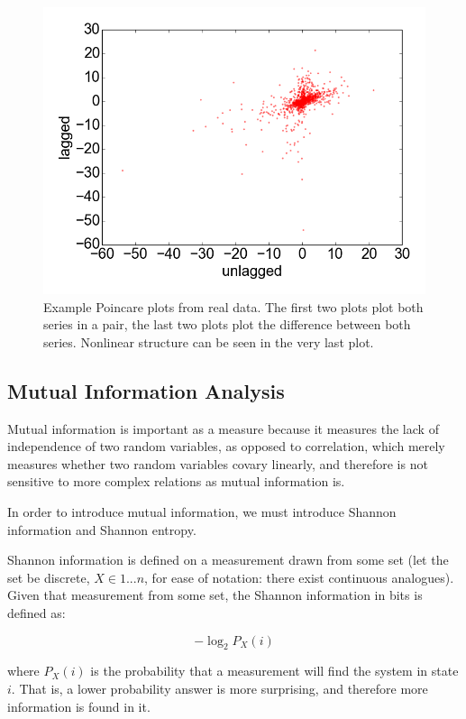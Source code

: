 \documentclass[12pt]{article}
\begin{document}
\begin{figure}
  \includegraphics[scale=0.4]{poincare_4}
  \caption{Example Poincare plots from real data. The first two plots plot both series in a pair, the last two plots plot the difference between both series. Nonlinear structure can be seen in the very last plot.}
  \label{fig:poincare_plots}
\end{figure}

\subsection{Mutual Information Analysis}

Mutual information is important as a measure because it measures the lack of independence of two random variables, as opposed to correlation, which merely measures whether two random variables covary linearly, and therefore is not sensitive to more complex relations as mutual information is.

In order to introduce mutual information, we must introduce Shannon information and Shannon entropy\cite{nnmi}.

Shannon information is defined on a measurement drawn from some set (let the set be discrete, $X \in {1 ... n}$, for ease of notation: there exist continuous analogues). Given that measurement from some set, the Shannon information in bits is defined as:

$$ -\log_2 P_X(i) $$

where $P_X(i)$ is the probability that a measurement will find the system in state $i$. That is, a lower probability answer is more surprising, and therefore more information is found in it.
\end{document}

